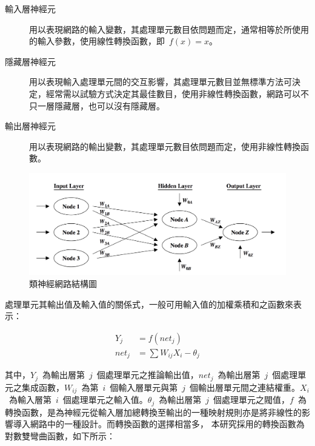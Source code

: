 \begin{description}
  \item [輸入層神經元]
  用以表現網路的輸入變數，其處理單元數目依問題而定，通常相等於所使用的輸入參數，使用線性轉換函數，即~$f(x)=x$。
  \item [隱藏層神經元]
  用以表現輸入處理單元間的交互影響，其處理單元數目並無標準方法可決定，經常需以試驗方式決定其最佳數目，使用非線性轉換函數，網路可以不只一層隱藏層，也可以沒有隱藏層。
  \item [輸出層神經元]
  用以表現網路的輸出變數，其處理單元數目依問題而定，使用非線性轉換函數。
\end{description}

\begin{figure}[hbtp]
  \begin{center}
    \includegraphics[width=1.0\textwidth]{figures/anns-network.png}
    \caption{類神經網路結構圖~\cite{larose2005discovering}} 
    \label{fig:ANN-network}
  \end{center}
\end{figure}

處理單元其輸出值及輸入值的關係式，一般可用輸入值的加權乘積和之函數來表示：

\begin{equation}\begin{split}  Y_j &= f(net_j) \\ net_j &= \sum W_{ij}X_i - \theta_j \label{eq:anns}\end{split}\end{equation} 

其中，$Y_j$~為輸出層第~$j$~個處理單元之推論輸出值，$net_j$~為輸出層第~$j$~個處理單元之集成函數，$W_{ij}$~為第~$i$~個輸入層單元與第~$j$~個輸出層單元間之連結權重。$X_i$~為輸入層第~$i$~個處理單元之輸入值。$\theta_j$~為輸出層第~$j$~個處理單元之閥值，$f$~為轉換函數，是為神經元從輸入層加總轉換至輸出的一種映射規則亦是將非線性的影響導入網路中的一種設計。而轉換函數的選擇相當多， 本研究採用的轉換函數為對數雙彎曲函數，如下所示：

